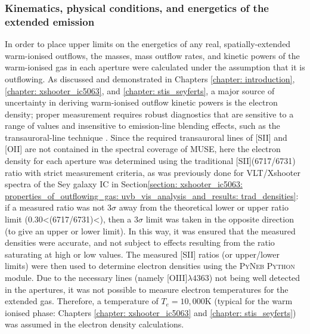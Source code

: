 \subsubsection{Kinematics, physical conditions, and energetics of the extended emission}
\label{section: muse_f13451_1232: analysis_and_results: extended_emission: aperture_properties}
\vspace*{-6pt}
In order to place upper limits on the energetics of any real, spatially-extended warm-ionised outflows, the masses, mass outflow rates, and kinetic powers of the warm-ionised gas in each aperture were calculated under the assumption that it is outflowing. As discussed and demonstrated in Chapters \ref{chapter: introduction}, \ref{chapter: xshooter_ic5063}, and \ref{chapter: stis_seyferts}, a major source of uncertainty in deriving warm-ionised outflow kinetic powers is the electron density; proper measurement requires robust diagnostics that are sensitive to a range of values and insensitive to emission-line blending effects, such as the transauroral-line technique \citep{Holt2011}. Since the required transauroral lines of [SII] and [OII] are not contained in the spectral coverage of MUSE, here the electron density for each aperture was determined using the traditional [SII](6717/6731) ratio with strict measurement criteria, as was previously done for VLT/Xshooter spectra of the Sey galaxy IC in Section\;\ref{section: xshooter_ic5063: properties_of_outflowing_gas: uvb_vis_analysis_and_results: trad_densities}: if a measured ratio was not 3$\sigma$ away from the theoretical lower or upper ratio limit (\mbox{0.30\;\textless\;[SII](6717/6731)\;\textless{}}), then a $3\sigma$ limit was taken in the opposite direction (to give an upper or lower limit). In this way, it was ensured that the measured densities were accurate, and not subject to effects resulting from the ratio saturating at high or low values. The measured [SII] ratios (or upper/lower limits) were then used to determine electron densities using the \textsc{PyNeb Python} module. Due to the necessary lines (namely [OIII]$\lambda4363$) not being well detected in the apertures, it was not possible to measure electron temperatures for the extended gas. Therefore, a temperature of $T_e=10,000$\;K (typical for the warm ionised phase: Chapters \ref{chapter: xshooter_ic5063} and \ref{chapter: stis_seyferts}) was assumed in the electron density calculations.

